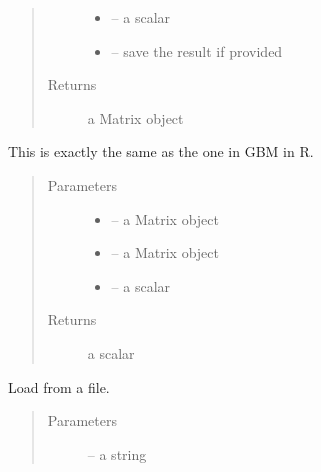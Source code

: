 \documentclass[letterpaper,10pt,english]{sphinxmanual}
\begin{document}
\begin{fulllineitems}
\begin{fulllineitems}
\begin{quote}
\begin{description}
\begin{itemize}
\item {} 
 -- a scalar

\item {} 
 -- save the result if provided

\end{itemize}

\item[{Returns}] \leavevmode
a Matrix object

\end{description}\end{quote}

\end{fulllineitems}


\begin{fulllineitems}
\label{\detokenize{index:dbm_py.interface.DBM.interact}}
This is exactly the same as the one in GBM in R.
\begin{quote}\begin{description}
\item[{Parameters}] \leavevmode\begin{itemize}
\item {} 
 -- a Matrix object

\item {} 
 -- a Matrix object

\item {} 
 -- a scalar

\end{itemize}

\item[{Returns}] \leavevmode
a scalar

\end{description}\end{quote}

\end{fulllineitems}


\begin{fulllineitems}
\label{\detokenize{index:dbm_py.interface.DBM.load}}
Load from a file.
\begin{quote}\begin{description}
\item[{Parameters}] \leavevmode
{} -- a string


\end{description}
\end{quote}
\end{fulllineitems}
\end{fulllineitems}
\end{document}
